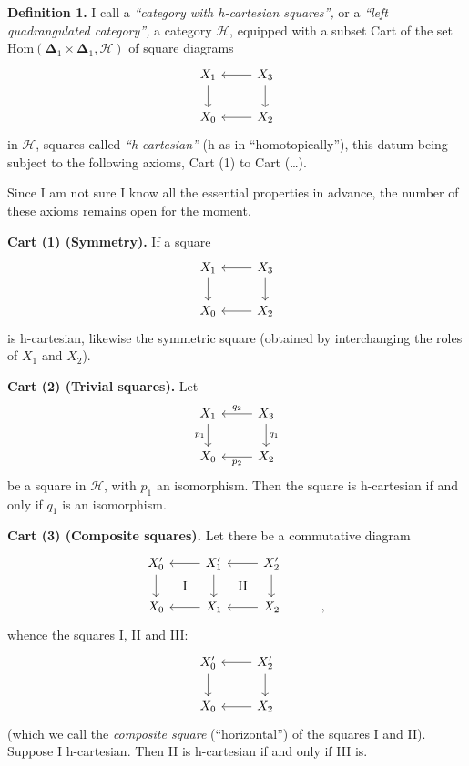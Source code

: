 \noindent\textbf{Definition 1.} I call a \textit{``category with h-cartesian squares'',} or a \textit{``left quadrangulated category'',} a category $\mathcal{H}$, equipped with a subset Cart of the set $\mathrm{Hom}(\boldsymbol{\Delta}_1\times\boldsymbol{\Delta}_1,\mathcal{H})$
of square diagrams 
\[
\begin{tikzcd}
X_1 \arrow[d] & X_3 \arrow[l] \arrow[d] \\
X_0 & X_2 \arrow[l]
\end{tikzcd}
\]
in $\mathcal{H}$, squares called \textit{``h-cartesian''} (h as in ``homotopically''), this  datum being subject to the following axioms, Cart (1) to Cart (\ldots).

\noindent Since I am not sure I know all the essential properties in advance, the number of these axioms remains open for the moment.

\noindent\textbf{Cart (1) (Symmetry).} If a square
\[
\begin{tikzcd}
X_1 \arrow[d] & X_3 \arrow[l] \arrow[d] \\
X_0 & X_2 \arrow[l]
\end{tikzcd}
\]
is h-cartesian, likewise the symmetric square (obtained by interchanging the roles of $X_1$ and $X_2$).

\noindent\textbf{Cart (2) (Trivial squares).} Let
\[
\begin{tikzcd}
X_1 \arrow[d, "p_1"'] & X_3 \arrow[l, "q_2"'] \arrow[d, "q_1"] \\
X_0 & X_2 \arrow[l, "p_2"]
\end{tikzcd}
\]
be a square in $\mathcal{H}$, with $p_1$ an isomorphism. Then the square is h-cartesian if and only if $q_1$ is an isomorphism.

\noindent\textbf{Cart (3) (Composite squares).} Let there be a commutative diagram
\[
\begin{tikzcd}
X'_0 \arrow[d] \arrow[dr, phantom, "\mathrm{I}"] & X'_1 \arrow[l] \arrow[d] \arrow[dr, phantom, "\mathrm{II}"] & X'_2 \arrow[l] \arrow[d] & \\
X_0 & X_1 \arrow[l] & X_2 \arrow[l] & ,
\end{tikzcd}
\]
whence the squares I, II and III:
\[
\begin{tikzcd}
X'_0 \arrow[d] & X'_2 \arrow[l] \arrow[d] \\
X_0 & X_2 \arrow[l]
\end{tikzcd}
\]
(which we call the \textit{composite square} (``horizontal'') of the squares I and II). Suppose I h-cartesian. Then II is h-cartesian if and only if III is.

